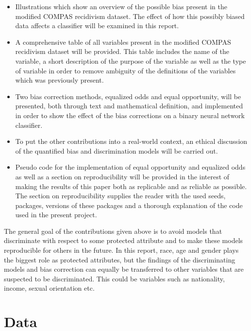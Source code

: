 \documentclass[11pt, fleqn, titlepage]{article}
\begin{document}
	\begin{itemize}
		\item Illustrations which show an overview of the possible bias present in the modified COMPAS recidivism dataset. The effect of how this possibly biased data affects a classifier will be examined in this report. 
		\item A comprehensive table of all variables present in the modified COMPAS recidivism dataset will be provided. This table includes the name of the variable, a short description of the purpose of the variable as well as the type of variable in order to remove ambiguity of the definitions of the variables which was previously present.
		\item Two bias correction methods, equalized odds and equal opportunity, will be presented, both through text and mathematical definition, and implemented in order to show the effect of the bias corrections on a binary neural network classifier.
		\item To put the other contributions into a real-world context, an ethical discussion of the quantified bias and discrimination models will be carried out.
		\item Pseudo code for the implementation of equal opportunity and equalized odds as well as a section on reproducibility will be provided in the interest of making the results of this paper both as replicable and as reliable as possible. The section on reproducibility supplies the reader with the used seeds, packages, versions of these packages and a thorough explanation of the code used in the present project.
	\end{itemize}
	The general goal of the contributions given above is to avoid models that discriminate with respect to some protected attribute and to make these models reproducible for others in the future. In this report, race, age and gender plays the biggest role as protected attributes, but the findings of the discriminating models and bias correction can equally be transferred to other variables that are suspected to be discriminated. This could be variables such as nationality, income, sexual orientation etc.
	
	\section{Data} \label{data}
	
\end{document}
